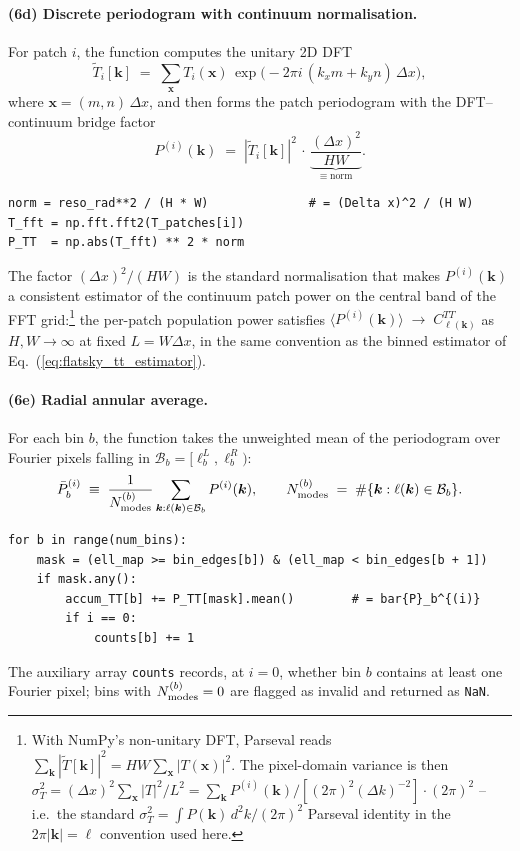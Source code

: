 \documentclass[11pt]{article}
\theoremstyle{definition}
\begin{document}
\paragraph{(6d) Discrete periodogram with continuum normalisation.} For
patch $i$, the function computes the unitary 2D DFT
\begin{equation}
  \widetilde T_i[\bm k] \;=\; \sum_{\bm x} T_i(\bm x)\,
   \exp\!\bigl(-2\pi i\,(k_x m + k_y n)\,\Delta x\bigr),
\end{equation}
where $\bm x=(m,n)\,\Delta x$, and then forms the patch periodogram with the
DFT--continuum bridge factor
\begin{equation}
  P^{(i)}(\bm k) \;=\; |\widetilde T_i[\bm k]|^2\,\cdot\,
  \underbrace{\frac{(\Delta x)^2}{HW}}_{\equiv\;\text{norm}}.
  \label{eq:periodogram_norm}
\end{equation}
\begin{lstlisting}[style=nb]
norm = reso_rad**2 / (H * W)              # = (Delta x)^2 / (H W)
T_fft = np.fft.fft2(T_patches[i])
P_TT  = np.abs(T_fft) ** 2 * norm
\end{lstlisting}
The factor $(\Delta x)^2/(HW)$ is the standard normalisation that makes
$P^{(i)}(\bm k)$ a consistent estimator of the continuum patch power on the
central band of the FFT grid:\footnote{With NumPy's
non-unitary DFT, Parseval reads $\sum_{\bm k}|\widetilde T[\bm k]|^2 = HW
\sum_{\bm x}|T(\bm x)|^2$. The pixel-domain variance is then
$\sigma_T^2 = (\Delta x)^2\sum_{\bm x}|T|^2/L^2 = \sum_{\bm k}P^{(i)}(\bm k)
/[(2\pi)^2(\Delta k)^{-2}]\cdot(2\pi)^2$ -- i.e.\ the standard
$\sigma_T^2 = \int P(\bm k)\,d^2k/(2\pi)^2$ Parseval identity in the
$2\pi|\bm k|\!=\!\ell$ convention used here.} the per-patch population power
satisfies
$\langle P^{(i)}(\bm k)\rangle \;\to\; C^{TT}_{\ell(\bm k)}$ as $H,W\to\infty$
at fixed $L=W\Delta x$, in the same convention as the binned estimator of
Eq.~(\ref{eq:flatsky_tt_estimator}).

\paragraph{(6e) Radial annular average.} For each bin $b$, the function takes
the unweighted mean of the periodogram over Fourier pixels falling in
$\mathcal B_b = [\ell_b^L,\ell_b^R)$:
\begin{equation}
  \bar P_b^{(i)}
  \;\equiv\; \frac{1}{N^{(b)}_{\rm modes}}
            \sum_{\bm k:\ell(\bm k)\in\mathcal B_b} P^{(i)}(\bm k),
  \qquad
  N^{(b)}_{\rm modes} \;=\; \#\{\bm k:\ell(\bm k)\in\mathcal B_b\}.
  \label{eq:per_patch_bin_mean}
\end{equation}
\begin{lstlisting}[style=nb]
for b in range(num_bins):
    mask = (ell_map >= bin_edges[b]) & (ell_map < bin_edges[b + 1])
    if mask.any():
        accum_TT[b] += P_TT[mask].mean()        # = bar{P}_b^{(i)}
        if i == 0:
            counts[b] += 1
\end{lstlisting}
The auxiliary array \texttt{counts} records, at $i=0$, whether bin $b$
contains at least one Fourier pixel; bins with $N^{(b)}_{\rm modes}=0$ are
flagged as invalid and returned as \texttt{NaN}.
\end{document}
